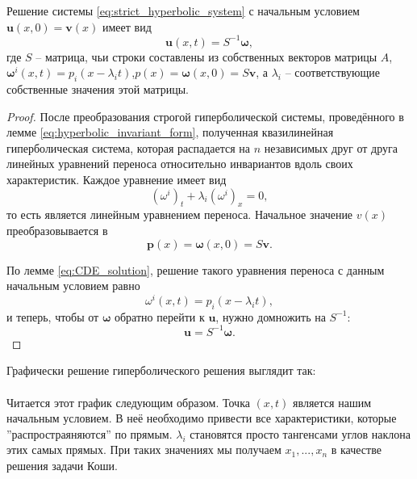\documentclass{article}
\begin{document}
\begin{theorem}
	Решение системы \eqref{eq:strict_hyperbolic_system} с начальным условием
	$\boldsymbol u(x,0)=\boldsymbol{v}(x)$ имеет вид
	\[\boldsymbol u(x,t)=S^{-1}\boldsymbol\omega,\]
	где $S$ -- матрица, чьи строки составлены из собственных векторов
	матрицы $A$, $\boldsymbol\omega^i(x,t)=p_i(x-\lambda_i t)$,\quad $p(x)=
	\boldsymbol\omega(x,0)=S\boldsymbol v$, а $\lambda_i$ --
	соответствующие собственные значения этой матрицы.
\end{theorem}

\begin{proof}
	После преобразования строгой гиперболической системы, проведённого в
	лемме \eqref{eq:hyperbolic_invariant_form}, полученная квазилинейная
	гиперболическая система, которая распадается на $n$ независимых друг от
	друга линейных уравнений переноса относительно инвариантов вдоль своих
	характеристик. Каждое уравнение имеет вид
	\[(\omega^i)_t+\lambda_i(\omega^i)_x=0,\]
	то есть является линейным уравнением переноса. Начальное значение $v(x)$
	преобразовывается в
	\[\boldsymbol p(x)=\boldsymbol\omega(x,0)=S\boldsymbol v.\]

	По лемме \eqref{eq:CDE_solution}, решение такого уравнения переноса
	с данным начальным условием равно
	\[\omega^i(x,t)=p_i(x-\lambda_i t),\]
	и теперь, чтобы от $\boldsymbol\omega$ обратно перейти к
	$\boldsymbol u$, нужно домножить на $S^{-1}$:
	\[\boldsymbol u=S^{-1}\boldsymbol\omega.\]
\end{proof}

Графически решение гиперболического решения выглядит так: \\

 \\

Читается этот график следующим образом. Точка $(x,t)$ является нашим начальным
условием. В неё необходимо привести все характеристики, которые
''распростраяняются'' по прямым. $\lambda_i$ становятся просто тангенсами
углов наклона этих самых прямых. При таких значениях мы получаем $x_1,...,x_n$
в качестве решения задачи Коши.
\end{document}
